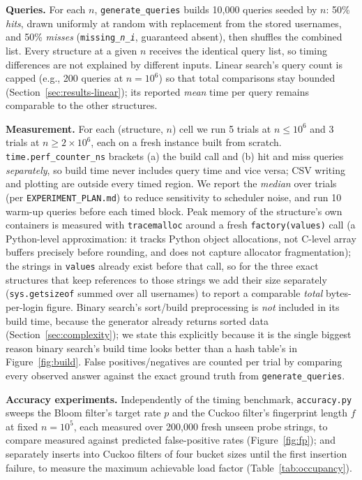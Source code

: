 \documentclass[acmsmall,screen,nonacm=true]{acmart}
\begin{document}
\textbf{Queries.} For each $n$, \texttt{generate\_queries} builds
10{,}000 queries seeded by $n$: 50\% \emph{hits}, drawn uniformly at random
with replacement from the stored usernames, and 50\% \emph{misses}
(\texttt{missing\_\textit{n}\_\textit{i}}, guaranteed absent), then shuffles
the combined list. Every structure at a given $n$ receives the identical
query list, so timing differences are not explained by different inputs.
Linear search's query count is capped (e.g., 200 queries at $n=10^6$) so
that total comparisons stay bounded (Section~\ref{sec:results-linear});
its reported \emph{mean} time per query remains comparable to the other
structures.

\textbf{Measurement.} For each (structure, $n$) cell we run 5 trials at
$n\le 10^6$ and 3 trials at $n\ge 2{\times}10^6$, each on a fresh instance
built from scratch. \texttt{time.perf\_counter\_ns} brackets (a) the build
call and (b) hit and miss queries \emph{separately}, so build time never
includes query time and vice versa; CSV writing and plotting are outside
every timed region. We report the \emph{median} over trials (per
\texttt{EXPERIMENT\_PLAN.md}) to reduce sensitivity to scheduler noise, and
run 10 warm-up queries before each timed block. Peak memory of the
structure's own containers is measured with \texttt{tracemalloc} around a
fresh \texttt{factory(values)} call (a Python-level approximation: it
tracks Python object allocations, not C-level array buffers precisely
before rounding, and does not capture allocator fragmentation); the strings
in \texttt{values} already exist before that call, so for the three exact
structures that keep references to those strings we add their size
separately (\texttt{sys.getsizeof} summed over all usernames) to report a
comparable \emph{total} bytes-per-login figure. Binary search's sort/build
preprocessing is \emph{not} included in its build time, because the
generator already returns sorted data (Section~\ref{sec:complexity}); we
state this explicitly because it is the single biggest reason binary
search's build time looks better than a hash table's in
Figure~\ref{fig:build}. False positives/negatives are counted per trial by
comparing every observed answer against the exact ground truth from
\texttt{generate\_queries}.

\textbf{Accuracy experiments.} Independently of the timing benchmark,
\texttt{accuracy.py} sweeps the Bloom filter's target rate $p$ and the
Cuckoo filter's fingerprint length $f$ at fixed $n=10^5$, each measured over
200{,}000 fresh unseen probe strings, to compare measured against predicted
false-positive rates (Figure~\ref{fig:fp}); and separately inserts into
Cuckoo filters of four bucket sizes until the first insertion failure, to
measure the maximum achievable load factor (Table~\ref{tab:occupancy}).
\end{document}

